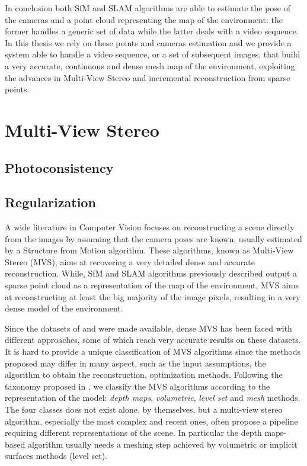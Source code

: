 
In conclusion both SfM and SLAM algorithms are able to estimate the pose of the cameras and a point cloud representing the map of the environment: the former handles a generic set of data while the latter deals with a video sequence. 
In this thesis we rely on these points and cameras estimation and we provide a system able to handle a video sequence, or a set of subsequent images, that build a very accurate, continuous and dense mesh map of the environment, exploiting the advances in Multi-View Stereo and incremental reconstruction from sparse points.

\section{Multi-View Stereo}

\subsection{Photoconsistency}
\subsection{Regularization}

A wide literature in Computer Vision focuses on reconstructing a scene directly from the images by assuming that the camera poses are known, usually estimated by a Structure from Motion algorithm.
These algorithms, known as Multi-View Stereo (MVS), aims at recovering a very detailed dense and accurate reconstruction. 
While, SfM and SLAM algorithms previously described output a sparse point cloud as a representation of the map of the environment, MVS aims at reconstructing at least the big majority of the image pixels, resulting in a very dense model of the environment.


Since the datasets of \cite{Seitz_et_al06} and \cite{strecha2008} were made available, dense MVS has been faced with different approaches, some of which reach very accurate results on these datasets.
It is hard to provide a unique classification of MVS algorithms since the methods proposed may differ in many aspect, such as the input assumptions, the algorithm to obtain the reconstruction, optimization methods. Following the taxonomy proposed in \cite{Seitz_et_al06}, we classify the MVS algorithms according to the representation of the model: \emph{depth maps}, \emph{volumetric},  \emph{level set} and \emph{mesh} methods. The four classes does not exist alone, by themselves, but a multi-view stereo algorithm, especially the most complex and recent ones, often propose a pipeline requiring different representations of the scene. In particular the depth maps-based algorithm usually needs a meshing step achieved by volumetric or implicit surfaces methods (level set).

